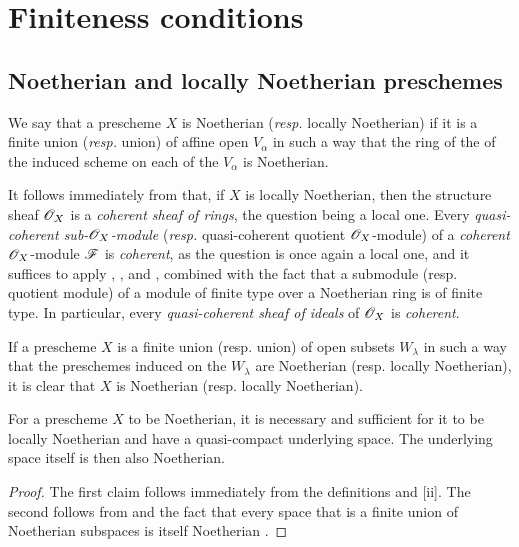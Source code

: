 \section{Finiteness conditions}
\label{section:finiteness-conditions}

\subsection{Noetherian and locally Noetherian preschemes}
\label{subsection:noetherian-and-locally-noetherian-preschemes}

\begin{defn}[6.1.1]
\label{1.6.1.1}
We say that a prescheme $X$ is Noetherian (\emph{resp.} locally Noetherian) if it is a finite union (\emph{resp.} union) of affine open $V_\alpha$ in such a way that the ring of the of the induced scheme on each of the $V_\alpha$ is Noetherian.
\end{defn}

It follows immediately from  that, if $X$ is locally Noetherian, then the structure sheaf $\mathscr{O}_X$ is a \emph{coherent sheaf of rings}, the question being a local one.
Every \emph{quasi-coherent sub-$\mathscr{O}_X$-module}
(\emph{resp.} quasi-coherent quotient $\mathscr{O}_X$-module) of a \emph{coherent} $\mathscr{O}_X$-module $\mathscr{F}$ is \emph{coherent}, as the question is once again a local one, and it suffices to apply , , and , combined with the fact that a submodule (resp. quotient module) of a module of finite type over a Noetherian ring is of finite type.
In particular, every \emph{quasi-coherent sheaf of ideals} of $\mathscr{O}_X$ is \emph{coherent}.

If a prescheme $X$ is a finite union (resp. union) of open subsets $W_\lambda$ in such a way that the preschemes induced on the $W_\lambda$ are Noetherian (resp. locally Noetherian), it is clear that $X$ is Noetherian (resp. locally Noetherian).

\begin{prop}[6.1.2]
\label{1.6.1.2}
For a prescheme $X$ to be Noetherian, it is necessary and sufficient for it to be locally Noetherian and have a quasi-compact underlying space.
The underlying space itself is then also Noetherian.
\end{prop}

\begin{proof}
\label{proof-1.6.1.2}
The first claim follows immediately from the definitions and [ii].
The second follows from  and the fact that every space that is a finite union of Noetherian subspaces is itself Noetherian .
\end{proof}

